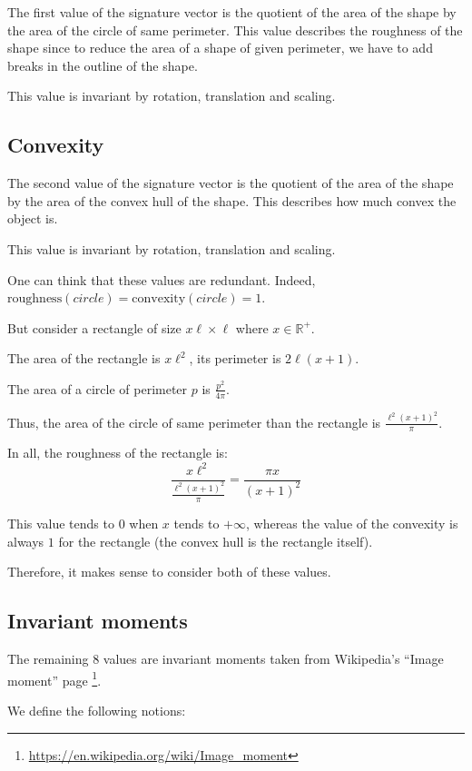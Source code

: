\documentclass[a4paper,12pt]{article}
\newcommand{\R}{\mathbb{R}}
\theoremstyle{example}
\theoremstyle{remark}
\theoremstyle{definition}
\begin{document}
The first value of the signature vector is the quotient of the area of the shape by the area of the circle of same perimeter. This value describes the roughness of the shape since to reduce the area of a shape of given perimeter, we have to add breaks in the outline of the shape.

This value is invariant by rotation, translation and scaling.

\subsection{Convexity}

The second value of the signature vector is the quotient of the area of the shape by the area of the convex hull of the shape. This describes how much convex the object is.

This value is invariant by rotation, translation and scaling.

One can think that these values are redundant. Indeed, $\mathrm{roughness}(circle) = \mathrm{convexity}(circle) = 1$.

But consider a rectangle of size $x\ell \times \ell$ where $x \in \R^+$.

The area of the rectangle is $x\ell^2$, its perimeter is $2\ell(x+1)$.

The area of a circle of perimeter $p$ is $\frac{p^2}{4\pi}$.

Thus, the area of the circle of same perimeter than the rectangle is $\frac{\ell^2(x+1)^2}{\pi}$.

In all, the roughness of the rectangle is:
\[\frac{x\ell^2}{\frac{\ell^2(x+1)^2}{\pi}} = \frac{\pi x}{(x+1)^2}\]

This value tends to $0$ when $x$ tends to $+\infty$, whereas the value of the convexity is always $1$ for the rectangle (the convex hull is the rectangle itself).

Therefore, it makes sense to consider both of these values.

\subsection{Invariant moments}

The remaining 8 values are invariant moments taken from Wikipedia's ``Image moment'' page \footnote{\url{https://en.wikipedia.org/wiki/Image_moment}}.

We define the following notions:
\end{document}
